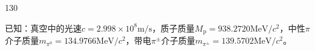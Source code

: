 \begin{problem}[第37届全国中学生物理竞赛决赛][反质子探测]{130}
\begin{subproblem}
        已知：真空中的光速$c = 2.998 \times 10^{8} \mathrm{m/s}$，质子质量$M _ { \mathrm { p } } = 938.2720 \mathrm{MeV} / c ^ { 2 }$，中性$\pi$介子质量$m _ { \pi ^ { 0 } } = 134.9766 \mathrm{MeV} / c ^ { 2 }$，带电$\pi ^ { \pm }$介子质量$m _ { \pi ^ { \pm } } = 139.5702 \mathrm{MeV} / c ^ { 2 }$。
    \end{subproblem}
\end{problem}